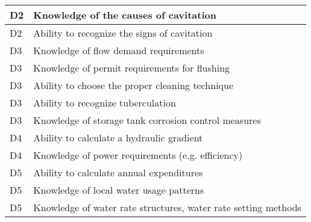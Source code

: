 \begin{table}[H]
\begin{tabular}{| m{1cm} |m{15cm} |}
D2 & Knowledge of the   causes of cavitation                                         \\ \hline
D2 & Ability to recognize   the signs of cavitation                                  \\ \hline
D3 & Knowledge of flow   demand requirements                                                                        \\ \hline
D3 & Knowledge of permit   requirements for flushing                                                                \\ \hline
D3 & Ability to choose the   proper cleaning technique                                                              \\ \hline
D3 & Ability to recognize   tuberculation                                                                           \\ \hline
D3 & Knowledge of storage   tank corrosion control measures                                                         \\ \hline
D4 & Ability to calculate a hydraulic gradient                                                                      \\ \hline
D4 & Knowledge of power requirements (e.g.   efficiency)                                                            \\ \hline
D5 & Ability to calculate   annual expenditures                                                                     \\ \hline
D5 & Knowledge of local   water usage patterns                                                                      \\ \hline
D5 & Knowledge of water   rate structures, water rate setting methods                                               \\ \hline
\end{tabular}
\end{table}
\newpage




